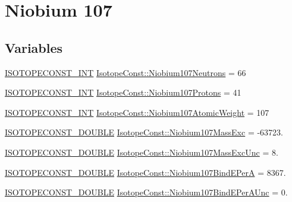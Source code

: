\hypertarget{group___isotope_const-_niobium-_nb107}{}\section{Niobium 107}
\label{group___isotope_const-_niobium-_nb107}
\subsection*{Variables}
\begin{DoxyCompactItemize}
\item 
\mbox{\hyperlink{group___isotope_const-_macros_ga5f18360b3e99483a35c32d789e62621c}{I\+S\+O\+T\+O\+P\+E\+C\+O\+N\+S\+T\+\_\+\+I\+NT}} \mbox{\hyperlink{group___isotope_const-_niobium-_nb107_ga90eb6f874adda5c0788d9974a0b38021}{Isotope\+Const\+::\+Niobium107\+Neutrons}} = 66
\item 
\mbox{\hyperlink{group___isotope_const-_macros_ga5f18360b3e99483a35c32d789e62621c}{I\+S\+O\+T\+O\+P\+E\+C\+O\+N\+S\+T\+\_\+\+I\+NT}} \mbox{\hyperlink{group___isotope_const-_niobium-_nb107_gafc8b5bc8454e812991838cf6a09e420b}{Isotope\+Const\+::\+Niobium107\+Protons}} = 41
\item 
\mbox{\hyperlink{group___isotope_const-_macros_ga5f18360b3e99483a35c32d789e62621c}{I\+S\+O\+T\+O\+P\+E\+C\+O\+N\+S\+T\+\_\+\+I\+NT}} \mbox{\hyperlink{group___isotope_const-_niobium-_nb107_gab4e705b18cdb06ec331e7b7a82162861}{Isotope\+Const\+::\+Niobium107\+Atomic\+Weight}} = 107
\item 
\mbox{\hyperlink{group___isotope_const-_macros_ga8f45a7272ce02c0b4c65c44636ed719a}{I\+S\+O\+T\+O\+P\+E\+C\+O\+N\+S\+T\+\_\+\+D\+O\+U\+B\+LE}} \mbox{\hyperlink{group___isotope_const-_niobium-_nb107_gad1c742352f93ac4ea384b391f4835d8e}{Isotope\+Const\+::\+Niobium107\+Mass\+Exc}} = -\/63723.
\item 
\mbox{\hyperlink{group___isotope_const-_macros_ga8f45a7272ce02c0b4c65c44636ed719a}{I\+S\+O\+T\+O\+P\+E\+C\+O\+N\+S\+T\+\_\+\+D\+O\+U\+B\+LE}} \mbox{\hyperlink{group___isotope_const-_niobium-_nb107_ga6f194e1585a6865c6d355c75cf6cc35b}{Isotope\+Const\+::\+Niobium107\+Mass\+Exc\+Unc}} = 8.
\item 
\mbox{\hyperlink{group___isotope_const-_macros_ga8f45a7272ce02c0b4c65c44636ed719a}{I\+S\+O\+T\+O\+P\+E\+C\+O\+N\+S\+T\+\_\+\+D\+O\+U\+B\+LE}} \mbox{\hyperlink{group___isotope_const-_niobium-_nb107_ga2ce8e73ccb73261336f28d535f3472bf}{Isotope\+Const\+::\+Niobium107\+Bind\+E\+PerA}} = 8367.
\item 
\mbox{\hyperlink{group___isotope_const-_macros_ga8f45a7272ce02c0b4c65c44636ed719a}{I\+S\+O\+T\+O\+P\+E\+C\+O\+N\+S\+T\+\_\+\+D\+O\+U\+B\+LE}} \mbox{\hyperlink{group___isotope_const-_niobium-_nb107_gaf4b06074d6b3fd7c370f4e873becc06a}{Isotope\+Const\+::\+Niobium107\+Bind\+E\+Per\+A\+Unc}} = 0.

\end{DoxyCompactItemize}
